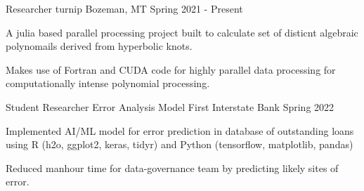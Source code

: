
\begin{cventries}
  \cventry
    {Researcher} %
    {turnip} %
    {Bozeman, MT} %
    {Spring 2021 - Present} %
    {
      \begin{cvitems} %
        \item {A julia based parallel processing project built to calculate set of disticnt algebraic polynomails derived from hyperbolic knots.}
		    \item {Makes use of Fortran and CUDA code for highly parallel data processing for computationally intense polynomial processing.}
      \end{cvitems}
    }

  \cventry
    {Student Researcher} %
    {Error Analysis Model} %
    {First Interstate Bank}
    {Spring 2022} %
    {
      \begin{cvitems} %
      	\item {Implemented AI/ML model for error prediction in database of outstanding loans using R (h2o, ggplot2, keras, tidyr) and Python (tensorflow, matplotlib, pandas)}
	      \item {Reduced manhour time for data-governance team by predicting likely sites of error.}
      \end{cvitems}
    }
\end{cventries}

